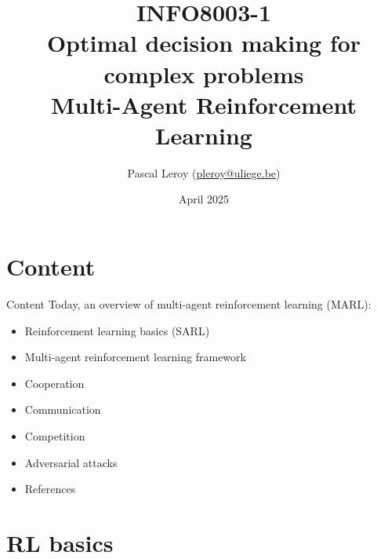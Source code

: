 \documentclass[9pt, hyperref={pdfusetitle,colorlinks=true,allcolors=DarkBlue}]{beamer}
\author{Pascal Leroy (\href{mailto:pleroy@uliege.be}{pleroy@uliege.be})}
\begin{document}
\title{
INFO8003-1 \\
Optimal decision making for complex problems
\\
\vspace{.7cm}
Multi-Agent Reinforcement Learning
}

\date{April 2025}
\maketitle


\section*{Content}
\begin{frame}{Content}
Today, an overview of multi-agent reinforcement learning (MARL):
\begin{itemize}
\vfill
\item Reinforcement learning basics (SARL)
\vfill
\item Multi-agent reinforcement learning framework
\vfill
\item Cooperation
\vfill
\item Communication
\vfill
\item Competition
\vfill
\item Adversarial attacks
\vfill
\item References
\end{itemize}

\end{frame}

\section{RL basics}
\end{document}
